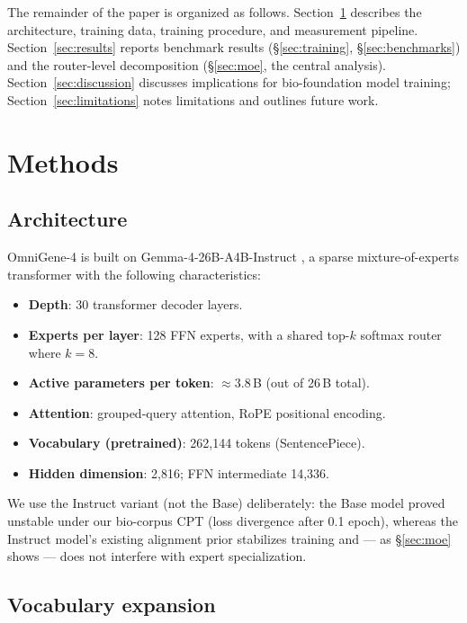 \documentclass[11pt]{article}
\begin{document}
The remainder of the paper is organized as follows. Section~\ref{sec:methods} describes the architecture, training data, training procedure, and measurement pipeline. Section~\ref{sec:results} reports benchmark results (\S\ref{sec:training}, \S\ref{sec:benchmarks}) and the router-level decomposition (\S\ref{sec:moe}, the central analysis). Section~\ref{sec:discussion} discusses implications for bio-foundation model training; Section~\ref{sec:limitations} notes limitations and outlines future work.

\section{Methods}
\label{sec:methods}

\subsection{Architecture}

OmniGene-4 is built on Gemma-4-26B-A4B-Instruct \citep{gemmateam2025}, a sparse mixture-of-experts transformer with the following characteristics:
\begin{itemize}\setlength\itemsep{0pt}
\item \textbf{Depth}: 30 transformer decoder layers.
\item \textbf{Experts per layer}: 128 FFN experts, with a shared top-$k$ softmax router where $k=8$.
\item \textbf{Active parameters per token}: $\approx 3.8$\,B (out of 26\,B total).
\item \textbf{Attention}: grouped-query attention, RoPE positional encoding.
\item \textbf{Vocabulary (pretrained)}: 262{,}144 tokens (SentencePiece).
\item \textbf{Hidden dimension}: 2{,}816; FFN intermediate 14{,}336.
\end{itemize}

We use the Instruct variant (not the Base) deliberately: the Base model proved unstable under our bio-corpus CPT (loss divergence after 0.1 epoch), whereas the Instruct model's existing alignment prior stabilizes training and --- as \S\ref{sec:moe} shows --- does not interfere with expert specialization.

\subsection{Vocabulary expansion}
\end{document}
